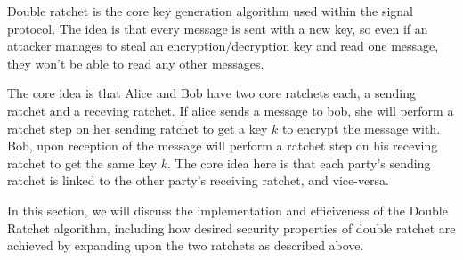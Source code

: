 Double ratchet is the core key generation algorithm used within the signal protocol.
The idea is that every message is sent with a new key, so even if an attacker manages 
to steal an encryption/decryption key and read one message, they won't be able to read 
any other messages. 

The core idea is that Alice and Bob have two core ratchets each, a sending ratchet and a 
receving ratchet. If alice sends a message to bob, she will perform a ratchet step on her sending 
ratchet to get a key $k$ to encrypt the message with. Bob, upon reception of the message will perform 
a ratchet step on his receving ratchet to get the same key $k$. The core idea here is that each party's 
sending ratchet is linked to the other party's receiving ratchet, and vice-versa.

In this section, we will discuss the implementation and efficiveness of 
the Double Ratchet algorithm, including how desired security properties of double ratchet are 
achieved by expanding upon the two ratchets as described above.
